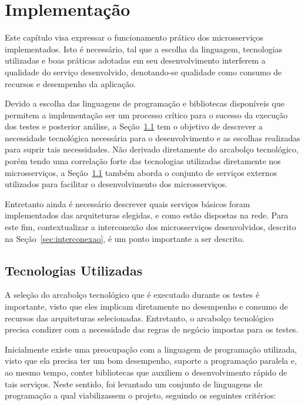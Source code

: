 \chapter{Implementação}
\label{cap5}



Este capítulo visa expressar o funcionamento prático dos microsserviços implementados.
%
Isto é necessário, tal que a escolha da linguagem, tecnologias utilizadas e boas práticas adotadas em seu desenvolvimento interferem a qualidade do serviço desenvolvido, denotando-se qualidade como consumo de recursos e desempenho da aplicação.





Devido a escolha das linguagens de programação e bibliotecas disponíveis que permitem a implementação ser um processo crítico para o sucesso da execução dos testes e posterior análise, a Seção~\ref{sec:tecnologias} tem o objetivo de descrever a necessidade tecnológica necessária para o desenvolvimento e as escolhas realizadas para suprir tais necessidades.
%
Não derivado diretamente do arcabolço tecnológico, porém tendo uma correlação forte das tecnologias utilizadas diretamente nos microsserviços, a Seção~\ref{sec:tecnologias} também aborda o conjunto de serviços externos utilizados para facilitar o desenvolvimento dos microsserviços.



Entretanto ainda é necessário descrever quais serviços básicos foram implementados das arquiteturas elegidas, e como estão dispostas na rede.
%
Para este fim, contextualizar a interconexão dos microsserviços desenvolvidos, descrito na Seção~\ref{sec:interconexao}, é um ponto importante a ser descrito.



\section{Tecnologias Utilizadas}
\label{sec:tecnologias}



A seleção do arcabolço tecnológico que é executado durante os testes é importante, visto que eles implicam diretamente no desempenho e consumo de recursos das arquiteturas selecionadas.
%
Entretanto, o arcabolço tecnológico precisa condizer com a necessidade das regras de negócio impostas para os testes.



Inicialmente existe uma preocupação com a linguagem de programação utilizada, visto que ela precisa ter um bom desempenho, suporte a programação paralela e, ao mesmo tempo, conter bibliotecas que auxiliem o desenvolvimento rápido de tais serviços.
%
Neste sentido, foi levantado um conjunto de linguagens de programação a qual viabilizassem o projeto, seguindo os seguintes critérios:



